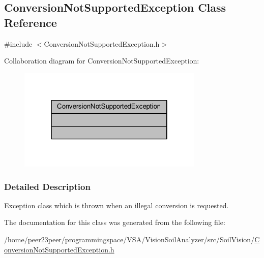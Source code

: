 \hypertarget{class_conversion_not_supported_exception}{}\subsection{Conversion\+Not\+Supported\+Exception Class Reference}
\label{class_conversion_not_supported_exception}


{\ttfamily \#include $<$Conversion\+Not\+Supported\+Exception.\+h$>$}



Collaboration diagram for Conversion\+Not\+Supported\+Exception\+:
\nopagebreak
\begin{figure}[H]
\begin{center}
\leavevmode
\includegraphics[width=250pt]{class_conversion_not_supported_exception__coll__graph}
\end{center}
\end{figure}


\subsubsection{Detailed Description}
Exception class which is thrown when an illegal conversion is requested. 

The documentation for this class was generated from the following file\+:\begin{DoxyCompactItemize}
\item 
/home/peer23peer/programmingspace/\+V\+S\+A/\+Vision\+Soil\+Analyzer/src/\+Soil\+Vision/\hyperlink{_conversion_not_supported_exception_8h}{Conversion\+Not\+Supported\+Exception.\+h}\end{DoxyCompactItemize}
